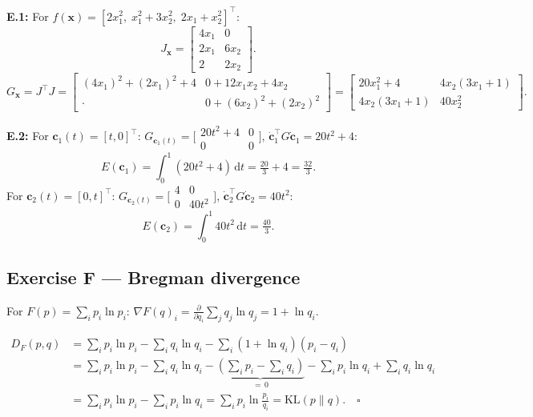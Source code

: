 \documentclass[12pt,a4paper]{article}
\newcommand{\KL}{\mathrm{KL}}
\begin{document}
\textbf{E.1:} For $f(\mathbf{x})=[2x_1^2,\;x_1^2+3x_2^2,\;2x_1+x_2^2]^\top$:
\[
  J_\mathbf{x}=\begin{bmatrix}4x_1&0\\2x_1&6x_2\\2&2x_2\end{bmatrix}.
\]
\[
  G_\mathbf{x}=J^\top J=\begin{bmatrix}(4x_1)^2+(2x_1)^2+4 & 0+12x_1x_2+4x_2\\
                                        \cdot & 0+(6x_2)^2+(2x_2)^2\end{bmatrix}
  =\begin{bmatrix}20x_1^2+4 & 4x_2(3x_1+1)\\4x_2(3x_1+1)& 40x_2^2\end{bmatrix}.
\]

\textbf{E.2:} For $\mathbf{c}_1(t)=[t,0]^\top$: $G_{\mathbf{c}_1(t)}=\bigl[\begin{smallmatrix}20t^2+4&0\\0&0\end{smallmatrix}\bigr]$,
$\dot{\mathbf{c}}_1^\top G\dot{\mathbf{c}}_1=20t^2+4$:
\[
  E(\mathbf{c}_1)=\int_0^1(20t^2+4)\,\mathrm{d}t=\tfrac{20}{3}+4=\boxed{\tfrac{32}{3}.}
\]
For $\mathbf{c}_2(t)=[0,t]^\top$: $G_{\mathbf{c}_2(t)}=\bigl[\begin{smallmatrix}4&0\\0&40t^2\end{smallmatrix}\bigr]$,
$\dot{\mathbf{c}}_2^\top G\dot{\mathbf{c}}_2=40t^2$:
\[
  E(\mathbf{c}_2)=\int_0^1 40t^2\,\mathrm{d}t=\boxed{\tfrac{40}{3}.}
\]

\subsection*{Exercise F --- Bregman divergence}

For $F(p)=\sum_i p_i\ln p_i$: $\nabla F(q)_i=\frac{\partial}{\partial q_i}\sum_j q_j\ln q_j = 1+\ln q_i$.

\begin{align*}
  D_F(p,q)&=\textstyle\sum_i p_i\ln p_i-\sum_i q_i\ln q_i-\sum_i(1+\ln q_i)(p_i-q_i)\\
  &=\textstyle\sum_i p_i\ln p_i-\sum_i q_i\ln q_i
    -\underbrace{(\sum_i p_i-\sum_i q_i)}_{=\,0}
    -\sum_i p_i\ln q_i+\sum_i q_i\ln q_i\\
  &=\textstyle\sum_i p_i\ln p_i-\sum_i p_i\ln q_i
  =\sum_i p_i\ln\frac{p_i}{q_i}=\KL(p\|q).\quad\square
\end{align*}
\end{document}
